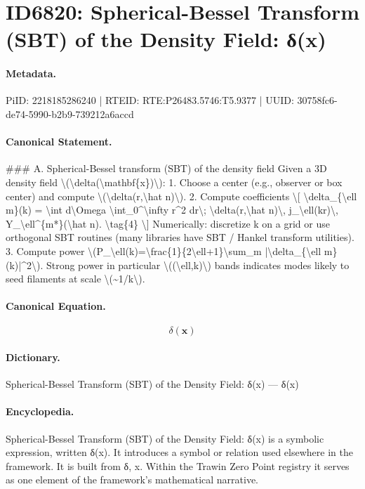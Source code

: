 \section*{ID6820: Spherical-Bessel Transform (SBT) of the Density Field: δ(x)}
\paragraph{Metadata.}
PiID: 2218185286240 | RTEID: RTE:P26483.5746:T5.9377 | UUID: 30758fc6-de74-5990-b2b9-739212a6accd

\paragraph{Canonical Statement.}
\#\#\# A. Spherical-Bessel transform (SBT) of the density field Given a 3D density field \textbackslash{}(\textbackslash{}delta(\textbackslash{}mathbf\{x\})\textbackslash{}): 1. Choose a center (e.g., observer or box center) and compute \textbackslash{}(\textbackslash{}delta(r,\textbackslash{}hat n)\textbackslash{}). 2. Compute coefficients \textbackslash{}[ \textbackslash{}delta\_\{\textbackslash{}ell m\}(k) = \textbackslash{}int d\textbackslash{}Omega \textbackslash{}int\_0\textasciicircum{}\textbackslash{}infty r\textasciicircum{}2 dr\textbackslash{}; \textbackslash{}delta(r,\textbackslash{}hat n)\textbackslash{}, j\_\textbackslash{}ell(kr)\textbackslash{}, Y\_\textbackslash{}ell\textasciicircum{}\{m*\}(\textbackslash{}hat n). \textbackslash{}tag\{4\} \textbackslash{}] Numerically: discretize k on a grid or use orthogonal SBT routines (many libraries have SBT / Hankel transform utilities). 3. Compute power \textbackslash{}(P\_\textbackslash{}ell(k)=\textbackslash{}frac\{1\}\{2\textbackslash{}ell+1\}\textbackslash{}sum\_m |\textbackslash{}delta\_\{\textbackslash{}ell m\}(k)|\textasciicircum{}2\textbackslash{}). Strong power in particular \textbackslash{}((\textbackslash{}ell,k)\textbackslash{}) bands indicates modes likely to seed filaments at scale \textbackslash{}(\textasciitilde{}1/k\textbackslash{}).

\paragraph{Canonical Equation.}
\[
\delta(\mathbf{x})
\]

\paragraph{Dictionary.}
Spherical-Bessel Transform (SBT) of the Density Field: δ(x) — δ(x)

\paragraph{Encyclopedia.}
Spherical-Bessel Transform (SBT) of the Density Field: δ(x) is a symbolic expression, written δ(x). It introduces a symbol or relation used elsewhere in the framework. It is built from δ, x. Within the Trawin Zero Point registry it serves as one element of the framework's mathematical narrative.
